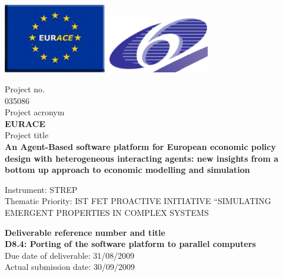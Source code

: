 \documentclass[a4paper,11pt]{article}
\begin{document}
\thispagestyle{empty}

\vspace{\baselineskip}
\includegraphics[width=45mm]{EURACE-logo.png}		
\hfill
\includegraphics[width=45mm]{FW6-logo.png}

\begin{center}
Project no.\\
035086\\
Project acronym\\
{\bf EURACE}\\
Project title\\
{\bf An Agent-Based software platform for European economic policy design with heterogeneous interacting agents: new insights from a bottom up approach to economic modelling and simulation}\\
\end{center}

\vspace*{\baselineskip}\noindent
Instrument: STREP\\[\baselineskip]
Thematic Priority: IST FET PROACTIVE INITIATIVE ``SIMULATING EMERGENT PROPERTIES IN COMPLEX SYSTEMS\\

\begin{center}
{\bf
Deliverable reference number and title\bigskip\\
D8.4: Porting of the software platform to parallel computers
}\bigskip\\
Due date of deliverable:
31/08/2009\\
Actual submission date:
30/09/2009\\
\end{center}
\end{document}
